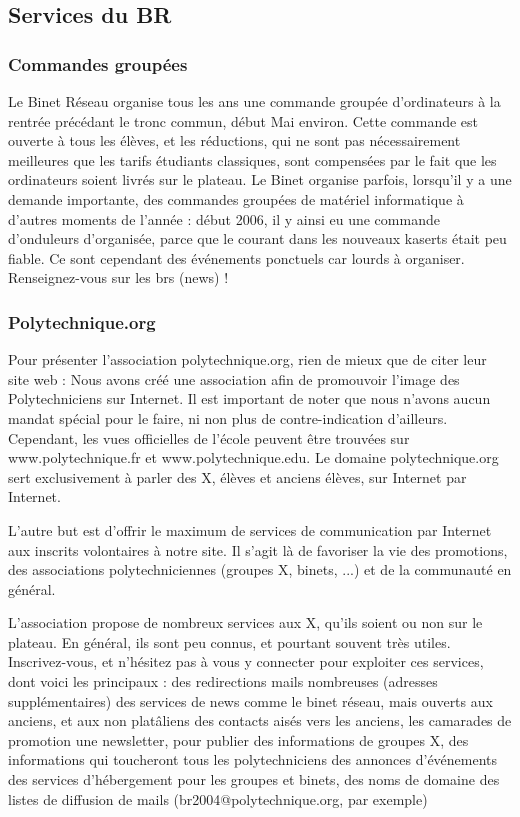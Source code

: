 \subsection{Services du BR}
\subsubsection{Commandes group\'ees}
Le Binet R\'eseau organise tous les ans une commande group\'ee d'ordinateurs \`a la rentr\'ee
pr\'ec\'edant le tronc commun, d\'ebut Mai environ. Cette commande est ouverte \`a tous les \'el\`eves,
et les r\'eductions, qui ne sont pas n\'ecessairement meilleures que les tarifs \'etudiants
classiques, sont compens\'ees par le fait que les ordinateurs soient livr\'es sur le plateau.
Le Binet organise parfois, lorsqu'il y a une demande importante, des commandes group\'ees
de mat\'eriel informatique \`a d'autres moments de l'ann\'ee : d\'ebut 2006, il y ainsi eu une
commande d'onduleurs d'organis\'ee, parce que le courant dans les nouveaux kaserts \'etait
peu fiable. Ce sont cependant des \'ev\'enements ponctuels car lourds \`a organiser.
Renseignez-vous sur les brs (news) !

\subsubsection{Polytechnique.org}
Pour pr\'esenter l'association polytechnique.org, rien de mieux que de citer leur site web :
  Nous avons cr\'e\'e une association afin de promouvoir l'image des Polytechniciens sur Internet.
  Il est important de noter que nous n'avons aucun mandat sp\'ecial pour le faire, ni non plus
  de contre-indication d'ailleurs. Cependant, les vues officielles de l'\'ecole peuvent \^etre
  trouv\'ees sur www.polytechnique.fr et www.polytechnique.edu. Le domaine polytechnique.org sert
  exclusivement \`a parler des X, \'el\`eves et anciens \'el\`eves, sur Internet par Internet.

  L'autre but est d'offrir le maximum de services de communication par Internet aux inscrits
  volontaires \`a notre site. Il s'agit l\`a de favoriser la vie des promotions, des associations
  polytechniciennes (groupes X, binets, ...) et de la communaut\'e en g\'en\'eral.

L'association propose de nombreux services aux X, qu'ils soient ou non sur le plateau.
En g\'en\'eral, ils sont peu connus, et pourtant souvent tr\`es utiles. Inscrivez-vous, et n'h\'esitez
pas \`a vous y connecter pour exploiter ces services, dont voici les principaux :
  des redirections mails nombreuses (adresses suppl\'ementaires)
  des services de news comme le binet r\'eseau, mais ouverts aux anciens, et aux non plat\^aliens
  des contacts ais\'es vers les anciens, les camarades de promotion
  une newsletter, pour publier des informations de groupes X, des informations qui toucheront tous les polytechniciens
  des annonces d'\'ev\'enements
  des services d'h\'ebergement pour les groupes et binets, des noms de domaine
  des listes de diffusion de mails (br2004@polytechnique.org, par exemple)

